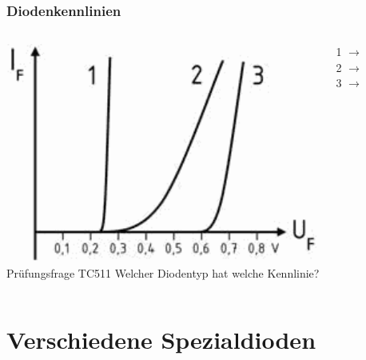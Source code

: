 \begin{frame}
  \frametitle{Diodenkennlinien}
  \begin{columns}[c]
      \includegraphics[width=1\textwidth,height=.85\textheight,keepaspectratio]{a05/tc511.png}\\
      {\tiny Prüfungsfrage TC511}
    Welcher Diodentyp hat welche Kennlinie?
    \begin{description}
      \item[1 $\rightarrow$] 
      \item[2 $\rightarrow$] 
      \item[3 $\rightarrow$] 
    \end{description}
  \end{columns}
\end{frame}

\section*{Verschiedene Spezialdioden}

